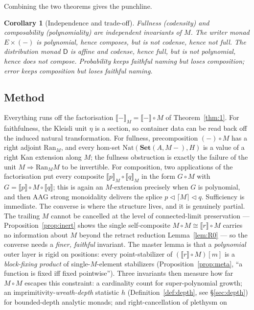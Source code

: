 \documentclass[11pt]{amsart}
\theoremstyle{plain}
\newtheorem{corollary}[theorem]{Corollary}
\theoremstyle{definition}
\newcommand{\Set}{\mathbf{Set}}
\newcommand{\Nat}{\mathrm{Nat}}
\newcommand{\Ran}{\mathrm{Ran}}
\newcommand{\ext}[1]{\llbracket #1 \rrbracket}
\newcommand{\extM}[1]{\llbracket #1 \rrbracket_{M}}
\newcommand{\ceil}[1]{\lceil #1 \rceil}
\newcommand{\D}{\mathsf{D}}
\begin{document}
Combining the two theorems gives the punchline.

\begin{corollary}[Independence and trade-off]\label{cor:tradeoff}
Fullness \textup{(codensity)} and composability \textup{(polynomiality)} are independent invariants
of $M$. The writer monad $E\times(-)$ is polynomial, hence composes, but is not codense, hence not
full. The distribution monad $\D$ is affine and codense, hence full, but is not polynomial, hence
does not compose. \emph{Probability keeps faithful naming but loses composition; error keeps
composition but loses faithful naming.}
\end{corollary}

\subsection*{Method}
Everything runs off the factorisation $\extM{-}=\ext{-}\circ M$ of Theorem~\ref{thm:1}. For
faithfulness, the Kleisli unit $\eta$ is a section, so container data can be read back off the
induced natural transformation. For fullness, precomposition $(-)\circ M$ has a right adjoint
$\Ran_M$, and every hom-set $\Nat(\Set(A,M{-}),H)$ is a value of a right Kan extension along $M$;
the fullness obstruction is exactly the failure of the unit $M\Rightarrow\Ran_M M$ to be invertible.
For composition, two applications of the factorisation put every composite $\extM{p}\circ\extM{q}$
in the form $G\circ M$ with $G=\ext{p}\circ M\circ\ext{q}$; this is again an $M$-extension precisely
when $G$ is polynomial, and then AAG strong monoidality delivers the splice $p\triangleleft\ceil
M\triangleleft q$. Sufficiency is immediate. The converse is where the structure lives, and it is
genuinely partial. The trailing $M$ cannot be cancelled at the level of connected-limit preservation
--- Proposition~\ref{prop:inert} shows the single self-composite $M\circ M\cong\ext r\circ M$ carries
no information about $M$ beyond the retract reduction Lemma~\ref{lem:R0} --- so the converse needs a
\emph{finer, faithful} invariant. The master lemma is that a \emph{polynomial} outer layer is
rigid on positions: every point-stabilizer of $(\ext r\circ M)[m]$ is a \emph{block-fixing product}
of single-$M$-element stabilizers (Proposition~\ref{prop:meta}, ``a function is fixed iff fixed
pointwise''). Three invariants then measure how far $M\circ M$ escapes this constraint: a cardinality
count for super-polynomial growth; an imprimitivity-\emph{wreath-depth} statistic $h$
(Definition~\ref{def:depth}, see \S\ref{sec:depth}) for bounded-depth analytic monads; and right-cancellation of plethysm on
\end{document}
